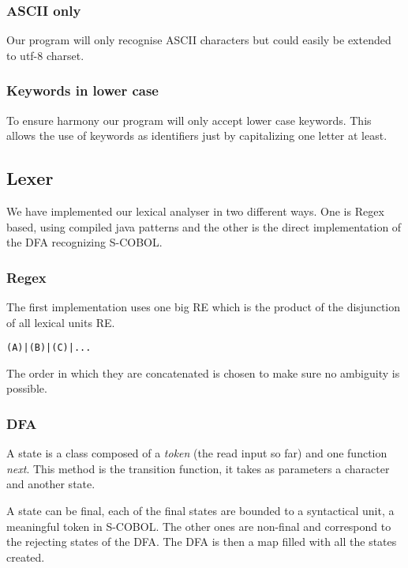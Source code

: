 \documentclass[a4paper,12pt]{article}
\begin{document}
\subsubsection{ASCII only}

Our program will only recognise ASCII characters but could easily be extended to utf-8 charset.

\subsubsection{Keywords in lower case}

To ensure harmony our program will only accept lower case keywords. This allows the use of keywords as identifiers just by capitalizing one letter at least.







\subsection{Lexer}
We have implemented our lexical analyser in two different ways. One is Regex based, using compiled java patterns and the other is the direct implementation of the DFA recognizing S-COBOL.
\subsubsection{Regex}

The first implementation uses one big RE which is the product of the disjunction of all lexical units RE.

\begin{verbatim}
(A)|(B)|(C)|...
\end{verbatim}

The order in which they are concatenated is chosen to make sure no ambiguity is possible.




\subsubsection{DFA}

A state is a class composed of a \textit{token} (the read input so far) and one function \textit{next}. This method is the transition function, it takes as parameters a character and another state.

A state can be final, each of the final states are bounded to a syntactical unit, a meaningful token in S-COBOL. The other ones are non-final and correspond to the rejecting states of the DFA.
The DFA is then a map filled with all the states created.
\end{document}

